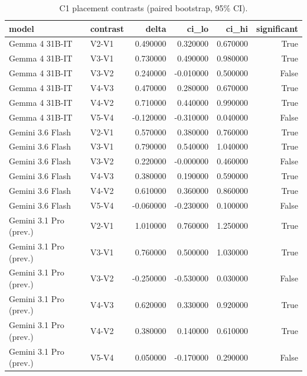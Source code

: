 \begin{table}
\caption{C1 placement contrasts (paired bootstrap, 95\% CI).}
\label{tab:c1-contrasts}
\begin{tabular}{llrrrr}
\toprule
model & contrast & delta & ci\_lo & ci\_hi & significant \\
\midrule
Gemma 4 31B-IT & V2-V1 & 0.490000 & 0.320000 & 0.670000 & True \\
Gemma 4 31B-IT & V3-V1 & 0.730000 & 0.490000 & 0.980000 & True \\
Gemma 4 31B-IT & V3-V2 & 0.240000 & -0.010000 & 0.500000 & False \\
Gemma 4 31B-IT & V4-V3 & 0.470000 & 0.280000 & 0.670000 & True \\
Gemma 4 31B-IT & V4-V2 & 0.710000 & 0.440000 & 0.990000 & True \\
Gemma 4 31B-IT & V5-V4 & -0.120000 & -0.310000 & 0.040000 & False \\
Gemini 3.6 Flash & V2-V1 & 0.570000 & 0.380000 & 0.760000 & True \\
Gemini 3.6 Flash & V3-V1 & 0.790000 & 0.540000 & 1.040000 & True \\
Gemini 3.6 Flash & V3-V2 & 0.220000 & -0.000000 & 0.460000 & False \\
Gemini 3.6 Flash & V4-V3 & 0.380000 & 0.190000 & 0.590000 & True \\
Gemini 3.6 Flash & V4-V2 & 0.610000 & 0.360000 & 0.860000 & True \\
Gemini 3.6 Flash & V5-V4 & -0.060000 & -0.230000 & 0.100000 & False \\
Gemini 3.1 Pro (prev.) & V2-V1 & 1.010000 & 0.760000 & 1.250000 & True \\
Gemini 3.1 Pro (prev.) & V3-V1 & 0.760000 & 0.500000 & 1.030000 & True \\
Gemini 3.1 Pro (prev.) & V3-V2 & -0.250000 & -0.530000 & 0.030000 & False \\
Gemini 3.1 Pro (prev.) & V4-V3 & 0.620000 & 0.330000 & 0.920000 & True \\
Gemini 3.1 Pro (prev.) & V4-V2 & 0.380000 & 0.140000 & 0.610000 & True \\
Gemini 3.1 Pro (prev.) & V5-V4 & 0.050000 & -0.170000 & 0.290000 & False \\
\bottomrule
\end{tabular}
\end{table}
